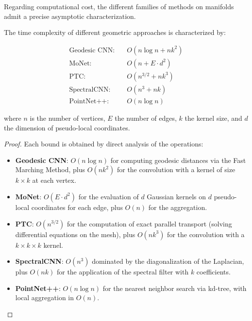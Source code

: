 Regarding computational cost, the different families of methods on manifolds admit a precise asymptotic characterization.

\begin{proposition}\label{prop:complejidad_aproximaciones_geometricas}
The time complexity of different geometric approaches is characterized by:

\begin{align}
\text{Geodesic CNN}: &\quad O(n \log n + nk^2) \\
\text{MoNet}: &\quad O(n + E \cdot d^2) \\
\text{PTC}: &\quad O(n^{3/2} + nk^3) \\
\text{SpectralCNN}: &\quad O(n^3 + nk) \\
\text{PointNet++}: &\quad O(n \log n)
\end{align}

where $n$ is the number of vertices, $E$ the number of edges, $k$ the kernel size, and $d$ the dimension of pseudo-local coordinates.
\end{proposition}

\begin{proof}
Each bound is obtained by direct analysis of the operations:
\begin{itemize}
    \item \textbf{Geodesic CNN}: $O(n \log n)$ for computing geodesic distances via the Fast Marching Method, plus $O(nk^2)$ for the convolution with a kernel of size $k \times k$ at each vertex.
    \item \textbf{MoNet}: $O(E \cdot d^2)$ for the evaluation of $d$ Gaussian kernels on $d$ pseudo-local coordinates for each edge, plus $O(n)$ for the aggregation.
    \item \textbf{PTC}: $O(n^{3/2})$ for the computation of exact parallel transport (solving differential equations on the mesh), plus $O(nk^3)$ for the convolution with a $k \times k \times k$ kernel.
    \item \textbf{SpectralCNN}: $O(n^3)$ dominated by the diagonalization of the Laplacian, plus $O(nk)$ for the application of the spectral filter with $k$ coefficients.
    \item \textbf{PointNet++}: $O(n \log n)$ for the nearest neighbor search via kd-tree, with local aggregation in $O(n)$.
\end{itemize}
\end{proof}

